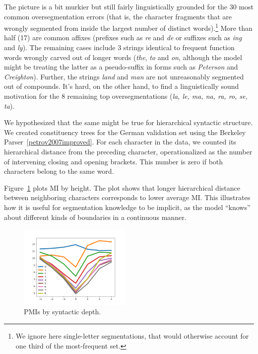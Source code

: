 The picture is a bit murkier but still fairly linguistically grounded
for the 30 most common oversegmentation errors (that is, the character
fragments that are wrongly segmented from inside the largest number of
distinct words).\footnote{We ignore here single-letter segmentations,
  that would otherwise account for one third of the most-frequent
  set.}  More than half (17) are common affixes (prefixes such as
\emph{re} and \emph{de} or suffixes such as \emph{ing} and
\emph{ly}). The remaining cases include 3 strings identical to frequent
function words wrongly carved out of longer words (\emph{the},
\emph{to} and \emph{on}, although the model might be treating the
latter as a pseudo-suffix in forms such as \emph{Peterson} and
\emph{Creighton}). Further, the strings \emph{land} and \emph{man} are not
unreasonably segmented out of compounds. It's hard, on the other hand,
to find a linguistically sound motivation for the 8 remaining top
oversegmentations (\emph{la, le, ma, na, ra, ro, se, ta}).


We hypothesized that the same might be true for hierarchical syntactic structure.
We created constituency trees for the German validation set using the Berkeley Parser~\ref{petrov2007improved}.
For each character in the data, we counted its hierarchical distance from the preceding character, operationalized as the number of intervening closing and opening brackets.
This number is zero if both characters belong to the same word.

Figure~\ref{fig:syntax-depth} plots MI by height.
The plot shows that longer hierarchical distance between neighboring characters corresponds to lower average MI.
This illustrates how it is useful for segmentation knowledge to be implicit, as the model ``knows'' about different kinds of boundaries in a continuous manner.

\begin{figure}
\includegraphics[width=0.48\textwidth]{figures/segmentation-profile-pmis-german-all-heights.png}
\caption{PMIs by syntactic depth.}\label{fig:syntax-depth}
\end{figure}


